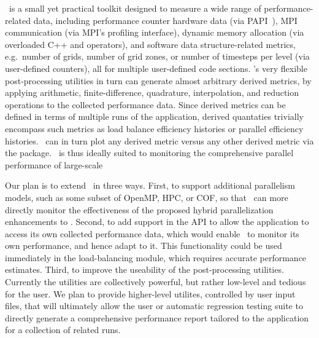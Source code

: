 \documentclass{article}
\begin{document}
\lcaperf\ is a small yet practical toolkit
 designed to measure a wide range of performance-related data,
 including performance counter hardware data (via PAPI~\cite{BrDo00}),
 MPI communication (via MPI's profiling interface), dynamic memory
 allocation (via overloaded C++  and 
 operators), and software data structure-related metrics, e.g.~number
 of grids, number of grid zones, or number of timesteps per level (via
 user-defined counters), all for multiple user-defined code sections.
 \lcaperf's very flexible post-processing utilities in turn can
 generate almost arbitrary derived metrics, by applying arithmetic,
 finite-difference, quadrature, interpolation, and reduction
 operations to the collected performance data.  Since derived metrics
 can be defined in terms of multiple runs of the application, derived
 quantaties trivially encompass such metrics as load balance
 efficiency histories or parallel efficiency histories.  \lcaperf\ can
 in turn plot any derived metric versus any other derived metric via
 the  package.  \lcaperf\ is thus ideally suited to
 monitoring the comprehensive parallel performance of large-scale

 Our plan is to extend \lcaperf\ in three ways.  First, to support
 additional parallelism models, such as some subset of OpenMP, HPC, or
 COF, so that \lcaperf\ can more directly monitor the effectiveness of
 the proposed hybrid parallelization enhancements to \enzo.  Second,
 to add support in the API to allow the application to access its own
 collected performance data, which would enable \enzo\ to monitor its
 own performance, and hence adapt to it.  This functionality could be
 used immediately in the load-balancing module, which requires
 accurate performance estimates.  Third, to improve the useability of
 the post-processing utilities.  Currently the utilities are
 collectively powerful, but rather low-level and tedious for the user.
 We plan to provide higher-level utilites, controlled by user input
 files, that will ultimately allow the user or automatic regression
 testing suite to directly generate a comprehensive performance report
 tailored to the application for a collection of related runs.

\end{document}
